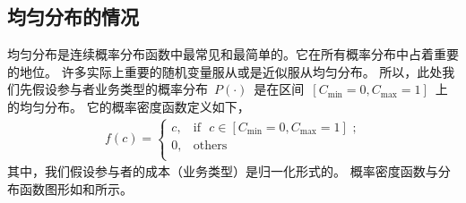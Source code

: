 \subsection{均匀分布的情况}
均匀分布是连续概率分布函数中最常见和最简单的。它在所有概率分布中占着重要的地位。
许多实际上重要的随机变量服从或是近似服从均匀分布。
所以，此处我们先假设参与者业务类型的概率分布~$P(\cdot)$~是在区间~$[C_{\min}=0, C_{\max}=1]$~上的均匀分布。
它的概率密度函数定义如下，
\begin{align}
    f(c) = \begin{cases} c, &\text{if ~$c \in [C_{\min}=0, C_{\max}=1]$~;}\\
        0, &\text{others}\\ 
    \end{cases} 
    \label{eqn_equilibrium_prob} 
\end{align}
其中，我们假设参与者的成本（业务类型）是归一化形式的。
概率密度函数与分布函数图形如和所示。
